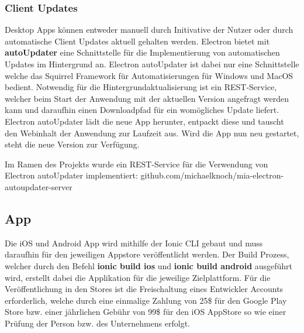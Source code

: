 \subsubsection{Client Updates}

Desktop Apps können entweder manuell durch Initivative der Nutzer oder durch
automatische Client Updates aktuell gehalten werden.
Electron bietet mit \textbf{autoUpdater} eine Schnittstelle für die Implementierung
von automatischen Updates im Hintergrund an.
Electron autoUpdater ist dabei nur eine Schnittstelle welche das Squirrel Framework
für Automatisierungen für Windows und MacOS bedient.
Notwendig für die Hintergrundaktualisierung ist ein REST-Service, welcher beim Start der Anwendung mit der
aktuellen Version angefragt werden kann
und daraufhin einen Downloadpfad für ein womögliches Update liefert.
Electron autoUpdater lädt die neue App herunter, entpackt diese und tauscht den Webinhalt der Anwendung zur Laufzeit aus.
Wird die App nun neu gestartet, steht die neue Version zur Verfügung.

Im Ramen des Projekts \projectname{} wurde ein REST-Service für die
Verwendung von Electron autoUpdater implementiert:
github.com/michaelknoch/mia-electron-autoupdater-server

\subsection{App}

Die iOS und Android App wird mithilfe der Ionic \ac{CLI} gebaut und muss daraufhin für den
jeweiligen Appstore veröffentlicht werden. Der Build Prozess,
welcher durch den Befehl \textbf{ionic build ios} und \textbf{ionic build android} ausgeführt wird,
erstellt dabei die Applikation für die jeweilige Zielplattform.
Für die Veröffentlichung in den Stores ist die Freischaltung eines Entwickler Accounts erforderlich,
welche durch eine einmalige Zahlung von 25\$ für den Google Play Store bzw. einer jährlichen Gebühr von 99\$
für den iOS AppStore so wie einer Prüfung der Person bzw. des Unternehmens erfolgt.
